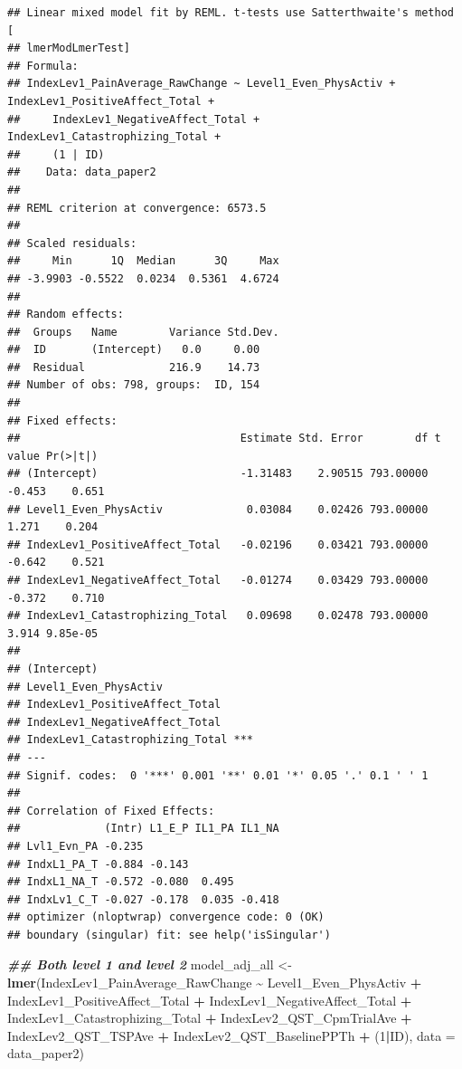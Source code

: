 \documentclass[
  12pt,
]{article}
\newenvironment{Shaded}{\begin{snugshade}}{\end{snugshade}}
\newcommand{\AttributeTok}[1]{\textcolor[rgb]{0.13,0.29,0.53}{#1}}
\newcommand{\DecValTok}[1]{\textcolor[rgb]{0.00,0.00,0.81}{#1}}
\newcommand{\DocumentationTok}[1]{\textcolor[rgb]{0.56,0.35,0.01}{\textbf{\textit{#1}}}}
\newcommand{\FunctionTok}[1]{\textcolor[rgb]{0.13,0.29,0.53}{\textbf{#1}}}
\newcommand{\NormalTok}[1]{#1}
\newcommand{\OtherTok}[1]{\textcolor[rgb]{0.56,0.35,0.01}{#1}}
\newcommand{\SpecialCharTok}[1]{\textcolor[rgb]{0.81,0.36,0.00}{\textbf{#1}}}
\begin{document}
\begin{verbatim}
## Linear mixed model fit by REML. t-tests use Satterthwaite's method [
## lmerModLmerTest]
## Formula: 
## IndexLev1_PainAverage_RawChange ~ Level1_Even_PhysActiv + IndexLev1_PositiveAffect_Total +  
##     IndexLev1_NegativeAffect_Total + IndexLev1_Catastrophizing_Total +  
##     (1 | ID)
##    Data: data_paper2
## 
## REML criterion at convergence: 6573.5
## 
## Scaled residuals: 
##     Min      1Q  Median      3Q     Max 
## -3.9903 -0.5522  0.0234  0.5361  4.6724 
## 
## Random effects:
##  Groups   Name        Variance Std.Dev.
##  ID       (Intercept)   0.0     0.00   
##  Residual             216.9    14.73   
## Number of obs: 798, groups:  ID, 154
## 
## Fixed effects:
##                                  Estimate Std. Error        df t value Pr(>|t|)
## (Intercept)                      -1.31483    2.90515 793.00000  -0.453    0.651
## Level1_Even_PhysActiv             0.03084    0.02426 793.00000   1.271    0.204
## IndexLev1_PositiveAffect_Total   -0.02196    0.03421 793.00000  -0.642    0.521
## IndexLev1_NegativeAffect_Total   -0.01274    0.03429 793.00000  -0.372    0.710
## IndexLev1_Catastrophizing_Total   0.09698    0.02478 793.00000   3.914 9.85e-05
##                                    
## (Intercept)                        
## Level1_Even_PhysActiv              
## IndexLev1_PositiveAffect_Total     
## IndexLev1_NegativeAffect_Total     
## IndexLev1_Catastrophizing_Total ***
## ---
## Signif. codes:  0 '***' 0.001 '**' 0.01 '*' 0.05 '.' 0.1 ' ' 1
## 
## Correlation of Fixed Effects:
##             (Intr) L1_E_P IL1_PA IL1_NA
## Lvl1_Evn_PA -0.235                     
## IndxL1_PA_T -0.884 -0.143              
## IndxL1_NA_T -0.572 -0.080  0.495       
## IndxLv1_C_T -0.027 -0.178  0.035 -0.418
## optimizer (nloptwrap) convergence code: 0 (OK)
## boundary (singular) fit: see help('isSingular')
\end{verbatim}

\begin{Shaded}
\begin{Highlighting}[]
\DocumentationTok{\#\# Both level 1 and level 2}
\NormalTok{model\_adj\_all }\OtherTok{\textless{}{-}} \FunctionTok{lmer}\NormalTok{(IndexLev1\_PainAverage\_RawChange }\SpecialCharTok{\textasciitilde{}}\NormalTok{ Level1\_Even\_PhysActiv }\SpecialCharTok{+}\NormalTok{ IndexLev1\_PositiveAffect\_Total }\SpecialCharTok{+}\NormalTok{ IndexLev1\_NegativeAffect\_Total }\SpecialCharTok{+}\NormalTok{ IndexLev1\_Catastrophizing\_Total }\SpecialCharTok{+}\NormalTok{ IndexLev2\_QST\_CpmTrialAve }\SpecialCharTok{+}\NormalTok{ IndexLev2\_QST\_TSPAve }\SpecialCharTok{+}\NormalTok{ IndexLev2\_QST\_BaselinePPTh }\SpecialCharTok{+}\NormalTok{ (}\DecValTok{1}\SpecialCharTok{|}\NormalTok{ID), }\AttributeTok{data =}\NormalTok{ data\_paper2)}
\end{Highlighting}
\end{Shaded}
\end{document}
